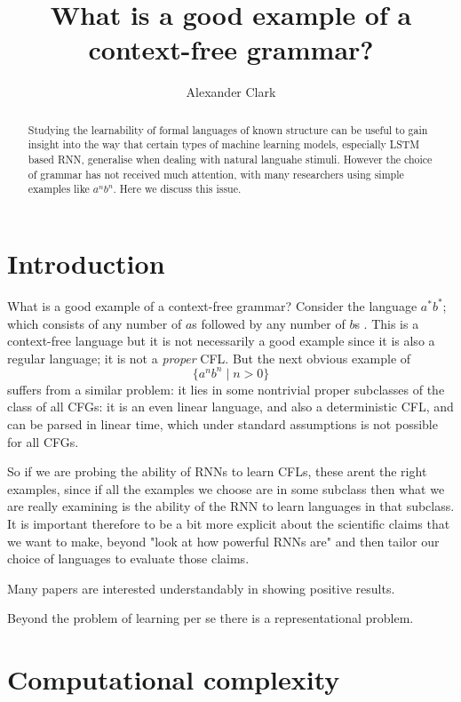 \documentclass{article}
\title{What is a good example of a context-free grammar?}
\author{Alexander Clark}
\begin{document}
\maketitle

\begin{abstract}
Studying the learnability of formal languages of known structure can be useful
to gain insight into the way that certain types of machine learning models, 
especially LSTM based RNN, generalise when dealing with natural languahe stimuli.
However the choice of grammar has not received much attention, with many researchers using simple
examples like $a^nb^n$.
Here we discuss this issue.
\end{abstract}

\section{Introduction}

What is a good example of a context-free grammar?
Consider the language $a^* b^*$; which consists of any number of $a$s followed by any number of $b$s
.
This is a context-free language but it is not necessarily a good example since it is also a regular language; it is not a
\emph{proper} CFL.
But the next obvious example of 
$$
\{ a^n b^n \mid n > 0\}
$$
suffers from a similar problem: it lies in some nontrivial proper subclasses of the class of all CFGs:
it is an even linear language, and also a deterministic CFL, and can be parsed in linear time, which under standard assumptions
is not possible for all CFGs.

So if we are probing the ability of RNNs to learn CFLs, these arent the right examples, since if all the examples we choose are in some subclass then what we are really examining is the ability of the RNN to learn languages in that subclass.
It is important therefore to be a bit more explicit about the scientific claims that we want to make, beyond "look at how powerful RNNs are" and then tailor our choice of languages to evaluate those claims.

Many papers are interested understandably in showing positive results.

Beyond the problem of learning per se there is a representational problem.


\section{Computational complexity}
\end{document}
